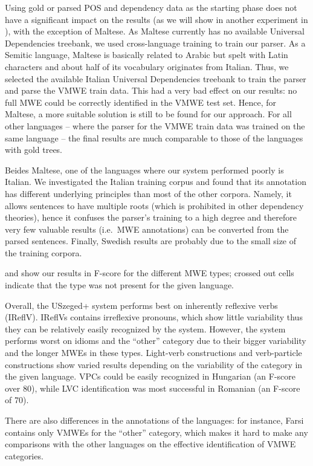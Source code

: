 \documentclass[output=paper,
modfonts,
]{langscibook}
\begin{document}
Using gold or parsed POS and dependency data as the starting phase does not have a significant impact on the results (as we will show in another experiment in ), with the exception of Maltese. As Maltese currently has no available Universal Dependencies treebank, we used cross-language training to train our parser. As a Semitic language, Maltese is basically related to Arabic but spelt with Latin characters and about half of its vocabulary originates from Italian. Thus, we selected the available Italian Universal Dependencies treebank to train the parser and parse the VMWE train data. This had a very bad effect on our results: no full MWE could be correctly identified in the VMWE test set. Hence, for Maltese, a more suitable solution is still to be found for our approach. For all other languages -- where the parser for the VMWE train data was trained on the same language -- the final results are much comparable to those of the languages with gold trees.

Beides Maltese, one of the languages where our system performed poorly is Italian. We investigated the Italian training corpus and found that its annotation has different underlying principles than most of the other corpora. Namely, it allows sentences to have multiple roots (which is prohibited in other dependency theories), hence it confuses the parser's training to a high degree and therefore very few valuable results (i.e.~MWE annotations) can be converted from the parsed sentences. Finally, Swedish results are probably due to the small size of the training corpora.

 and  show our results in F-score for the different MWE types; crossed out cells indicate that the type was not present for the given language. 

Overall, the USzeged+ system performs best on inherently reflexive verbs (IReflV). IReflVs contains irreflexive pronouns, which show little variability thus they can be relatively easily recognized by the system. However, the system performs worst on idioms and the ``other'' category due to their bigger variability and the longer MWEs in these types. Light-verb constructions and verb-particle constructions show varied results depending on the variability of the category in the given language. VPCs could be easily recognized in Hungarian (an F-score over 80), while LVC identification was most successful in Romanian (an F-score of 70).

There are also differences in the annotations of the languages: for instance, Farsi contains only VMWEs for the ``other'' category, which makes it hard to make any comparisons with the other languages on the effective identification of VMWE categories.
\end{document}
